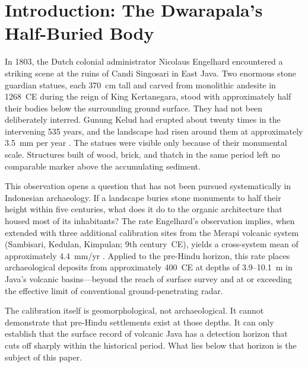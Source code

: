 \documentclass[12pt,a4paper]{article}
\begin{document}
\begin{abstract}
\medskip
\noindent\textbf{Keywords:} archaeological taphonomy; multi-channel convergence; pre-Hindu Nusantara; invisible civilisations; selective survival; volcanic tropical archaeology; Indonesian prehistory
\end{abstract}


\section{Introduction: The Dwarapala's Half-Buried Body}

In 1803, the Dutch colonial administrator Nicolaus Engelhard encountered a striking scene at the ruins of Candi Singosari in East Java. Two enormous stone guardian statues, each 370~cm tall and carved from monolithic andesite in 1268~CE during the reign of King Kertanegara, stood with approximately half their bodies below the surrounding ground surface. They had not been deliberately interred. Gunung Kelud had erupted about twenty times in the intervening 535 years, and the landscape had risen around them at approximately 3.5~mm per year \citep{kinney2003}. The statues were visible only because of their monumental scale. Structures built of wood, brick, and thatch in the same period left no comparable marker above the accumulating sediment.

This observation opens a question that has not been pursued systematically in Indonesian archaeology. If a landscape buries stone monuments to half their height within five centuries, what does it do to the organic architecture that housed most of its inhabitants? The rate Engelhard's observation implies, when extended with three additional calibration sites from the Merapi volcanic system (Sambisari, Kedulan, Kimpulan; 9th century~CE), yields a cross-system mean of approximately 4.4~mm/yr \citep[hereafter P1-core]{amien_p1core}. Applied to the pre-Hindu horizon, this rate places archaeological deposits from approximately 400~CE at depths of 3.9--10.1~m in Java's volcanic basins---beyond the reach of surface survey and at or exceeding the effective limit of conventional ground-penetrating radar.

The calibration itself is geomorphological, not archaeological. It cannot demonstrate that pre-Hindu settlements exist at those depths. It can only establish that the surface record of volcanic Java has a detection horizon that cuts off sharply within the historical period. What lies below that horizon is the subject of this paper.
\end{document}
